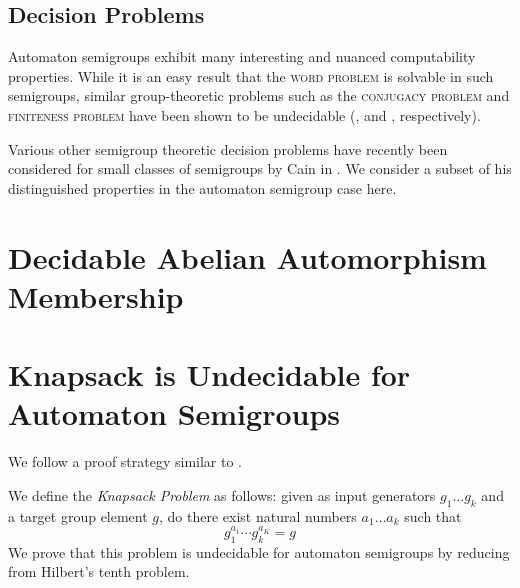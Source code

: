 \documentclass[10pt]{article} %
\newcommand{\defn}[1]{\textit{#1}}
\newcommand{\decprob}[1]{\textsc{#1}}
\begin{document}
\subsection*{Decision Problems}
Automaton semigroups exhibit many interesting and nuanced computability properties. While it is an easy result that the \decprob{word problem} is solvable in such semigroups, similar group-theoretic problems such as the \decprob{conjugacy problem} and \decprob{finiteness problem} have been shown to be undecidable (\cite{sunic:conj}, and \cite{gillibert:finite}, respectively).

Various other semigroup theoretic decision problems have recently been considered for small classes of semigroups by Cain in \cite{Cain09:dec_prob}. We consider a subset of his distinguished properties in the automaton semigroup case here.


\section{Decidable Abelian Automorphism Membership}

\section{Knapsack is Undecidable for Automaton Semigroups}
We follow a proof strategy similar to \cite{Konig15:knapsack}.

We define the \defn{Knapsack Problem} as follows: given as input generators $g_1 \ldots g_k$ and a target group element $g$, do there exist natural numbers $a_1\ldots a_k$ such that
\[ g_1^{a_1} \cdots g_k^{a_K} = g \]
We prove that this problem is undecidable for automaton semigroups by reducing from %
    Hilbert's tenth problem.


\end{document}
